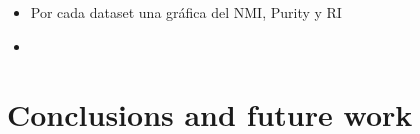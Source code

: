 \documentclass[runningheads]{llncs}
\begin{document}
\begin{itemize}
\item Por cada dataset una gráfica del NMI, Purity y RI
\item 
\end{itemize}
\section{Conclusions and future work}

%
%
%


%
\end{document}
